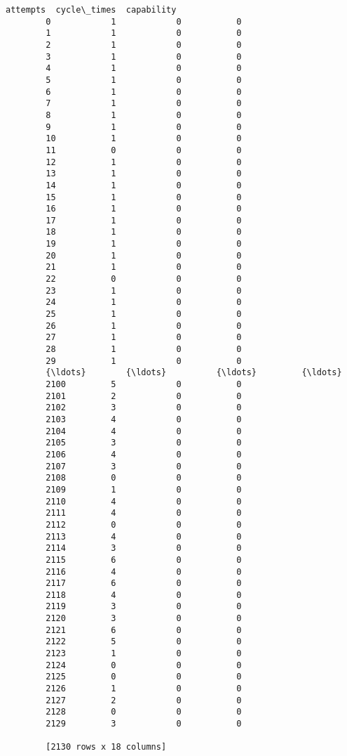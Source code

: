 \documentclass[11pt]{article}
\begin{document}
\begin{Verbatim}[commandchars=\\\{\}]
              attempts  cycle\_times  capability  
        0            1            0           0  
        1            1            0           0  
        2            1            0           0  
        3            1            0           0  
        4            1            0           0  
        5            1            0           0  
        6            1            0           0  
        7            1            0           0  
        8            1            0           0  
        9            1            0           0  
        10           1            0           0  
        11           0            0           0  
        12           1            0           0  
        13           1            0           0  
        14           1            0           0  
        15           1            0           0  
        16           1            0           0  
        17           1            0           0  
        18           1            0           0  
        19           1            0           0  
        20           1            0           0  
        21           1            0           0  
        22           0            0           0  
        23           1            0           0  
        24           1            0           0  
        25           1            0           0  
        26           1            0           0  
        27           1            0           0  
        28           1            0           0  
        29           1            0           0  
        {\ldots}        {\ldots}          {\ldots}         {\ldots}  
        2100         5            0           0  
        2101         2            0           0  
        2102         3            0           0  
        2103         4            0           0  
        2104         4            0           0  
        2105         3            0           0  
        2106         4            0           0  
        2107         3            0           0  
        2108         0            0           0  
        2109         1            0           0  
        2110         4            0           0  
        2111         4            0           0  
        2112         0            0           0  
        2113         4            0           0  
        2114         3            0           0  
        2115         6            0           0  
        2116         4            0           0  
        2117         6            0           0  
        2118         4            0           0  
        2119         3            0           0  
        2120         3            0           0  
        2121         6            0           0  
        2122         5            0           0  
        2123         1            0           0  
        2124         0            0           0  
        2125         0            0           0  
        2126         1            0           0  
        2127         2            0           0  
        2128         0            0           0  
        2129         3            0           0  
        
        [2130 rows x 18 columns]
\end{Verbatim}
            
\end{document}
